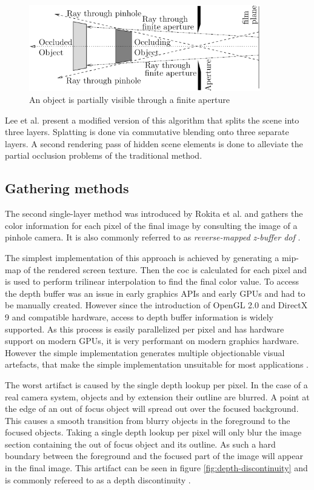 \begin{figure}
    \centering
    \includegraphics[width=0.9\textwidth]{images/partial-occlusion.png}
    \caption{An object is partially visible through a finite aperture \cite{Barsky.2003b}}
    \label{fig:partial-occlusion}
\end{figure}

Lee et al. \cite{Lee.2008} present a modified version of this algorithm that splits the scene into three layers.
Splatting is done via commutative blending onto three separate layers.
A second rendering pass of hidden scene elements is done to alleviate the partial occlusion problems of the traditional method.

\subsection{Gathering methods}
The second single-layer method was introduced by Rokita et al. \cite{Rokita.1993} and gathers the color information for each pixel of the final image by consulting the image of a pinhole camera.
It is also commonly referred to as \textit{reverse-mapped z-buffer \gls{dof}} \cite{Gilham.2007}.

The simplest implementation of this approach is achieved by generating a mip-map of the rendered screen texture.
Then the \gls{coc} is calculated for each pixel and is used to perform trilinear interpolation to find the final color value.
To access the depth buffer was an issue in early graphics APIs and early GPUs and had to be manually created.
However since the introduction of OpenGL 2.0 and DirectX 9 and compatible hardware, access to depth buffer information is widely supported.
As this process is easily parallelized per pixel and has hardware support on modern GPUs, it is very performant on modern graphics hardware.
However the simple implementation generates multiple objectionable visual artefacts, that make the simple implementation unsuitable for most applications \cite{Demers.2005, Hammon.2008}.

The worst artifact is caused by the single depth lookup per pixel.
In the case of a real camera system, objects and by extension their outline are blurred.
A point at the edge of an out of focus object will spread out over the focused background.
This causes a smooth transition from blurry objects in the foreground to the focused objects.
Taking a single depth lookup per pixel will only blur the image section containing the out of focus object and its outline.
As such a hard boundary between the foreground and the focused part of the image will appear in the final image.
This artifact can be seen in figure \ref{fig:depth-discontinuity} and is commonly refereed to as a depth discontinuity \cite{Demers.2005}.

